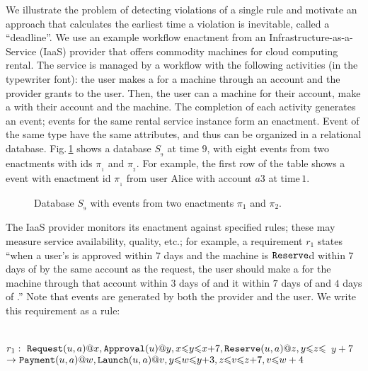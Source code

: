 We illustrate the problem of detecting violations
of a single rule
and motivate an approach
that calculates the earliest time a violation is inevitable,
called a ``deadline''.
We use an example workflow enactment from
an Infrastructure-as-a-Service (IaaS) provider
that offers
commodity machines for cloud computing rental.
The service is managed
by a workflow with the following activities
(in the typewriter font):
the user makes a {\Request} for a machine 
through an account and
the provider 
grants {\Approval} to the user.
Then, the user can {\Reserve}
a machine for their account,
make a {\Payment} with their account
and {\Launch} the machine.
The completion of each
activity
generates an event;
events for the same rental service instance
form an enactment.
Event of the same type
have the same attributes,
and thus
can be organized in a relational database.
Fig.\,\ref{fig:example_state}
shows a database $S_{_9}$ at time $9$,
with eight events
from two enactments with ids $\pi_{_1}$ and $\pi_{_2}$.
For example, the first row of the {\Request}
table shows a {\Request} event
with enactment id $\pi_{_1}$
from user Alice with account $a3$ at time\,$1$.

\begin{figure}[ht]
  \centering
  {}
  \caption{\normalsize Database $S_{_9}$ with events from two enactments $\pi_1$ and $\pi_2$.}
  \label{fig:example_state}
\end{figure}

The IaaS provider monitors its enactment against specified rules;
these may measure service availability, quality, etc.;
for example,
a requirement $r_1$ states
``when a user's {\Request}
is approved within $7$ days
and the machine is $\texttt{Reserve}$d within $7$ days of {\Approval}
by the same account as the request,
the user should make a {\Payment} for the machine
through that account
within $3$ days of {\Approval}
and 
{\Launch} it within $7$ days of {\Reserve}
and $4$ days of {\Payment}.''
Note that
events are generated by both the provider
and the user.
We write this requirement as a rule:
\begin{center}
  \vspace*{-2mm}
~~~~~~~~~$r_1:\ \texttt{Request}(u,a)@x,
\texttt{Approval}(u)@y,
x {\leqslant} y {\leqslant} x {+} 7,
\texttt{Reserve}(u,a)@z,
y {\leqslant} z {\leqslant}$ $y{+}7$\\
$\rightarrow
\texttt{Payment}(u,a)@w,
\texttt{Launch}(u,a)@v,
y{\leqslant} w {\leqslant} y {+} 3,
z{\leqslant} v {\leqslant} z {+} 7,
v{\leqslant}w+4$
\vspace*{-2mm}
\end{center}

